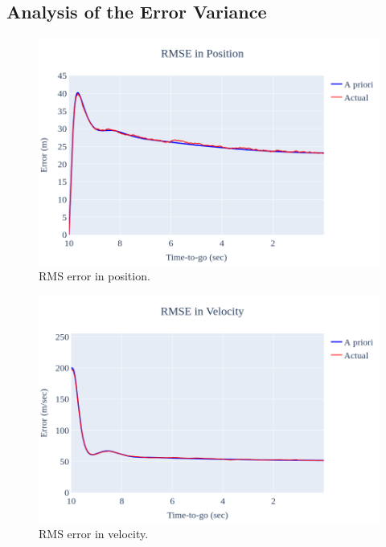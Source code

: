 \documentclass{article}
\begin{document}
\subsection{Analysis of the Error Variance}
\begin{figure}
    \centering
    \includegraphics[width=1\textwidth]{rmse_pos.png}
    \caption{RMS error in position.}
    \label{rmse_pos}
\end{figure}

\begin{figure}
    \centering
    \includegraphics[width=1\textwidth]{rmse_vel.png}
    \caption{RMS error in velocity.}
    \label{rmse_vel}
\end{figure}
\end{document}

